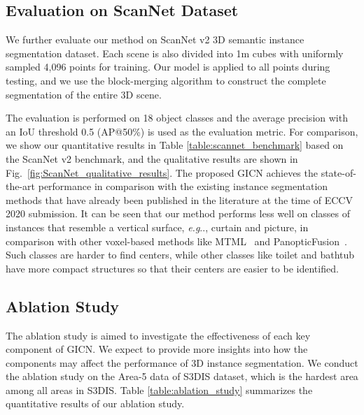 \documentclass[runningheads]{llncs}
\makeatletter
\DeclareRobustCommand\onedot{\futurelet\@let@token\@onedot}
\def\@onedot{\ifx\@let@token.\else.\null\fi\xspace}
\def\eg{\emph{e.g}\onedot} \def\Eg{\emph{E.g}\onedot}
\makeatother
\begin{document}
\subsection{Evaluation on ScanNet Dataset}
We further evaluate our method on ScanNet v2 3D semantic instance segmentation dataset. Each scene is also divided into 1m cubes with uniformly sampled 4{,}096 points for training. Our model is applied to all points during testing, and we use the block-merging algorithm \cite{WangYHN18} to construct the complete segmentation of the entire 3D scene.

The evaluation is performed on 18 object classes and the average precision with an IoU threshold 0.5 (AP@50\%) is used as the evaluation metric. For comparison, we show our quantitative results in Table \ref{table:scannet_benchmark} based on the ScanNet v2 benchmark, and the qualitative results are shown in Fig.~\ref{fig:ScanNet_qualitative_results}. The proposed GICN achieves the state-of-the-art performance in comparison with the existing instance segmentation methods that have already been published in the literature at the time of ECCV 2020 submission. It can be seen that our method performs less well on classes of instances that resemble a vertical surface, \eg, curtain and picture, in comparison with other voxel-based methods like MTML~\cite{LahoudGPO19} and PanopticFusion~\cite{NaritaSIK19}. Such classes are harder to find centers, while other classes like toilet and bathtub have more compact structures so that their centers are easier to be identified. 



\subsection{Ablation Study}
The ablation study is aimed to investigate the effectiveness of each key component of GICN. We expect to provide more insights into how the components may affect the performance of 3D instance segmentation. We conduct the ablation study on the Area-5 data of S3DIS dataset, which is the hardest area among all areas in S3DIS. Table \ref{table:ablation_study} summarizes the quantitative results of our ablation study.

\begin{comment}
Need to add new ablation study : prior information of class size (from CVPR revier #5)

Reviewer #4 does not like the ablation study of semantic prediction, could we remove it ?
\end{comment}
\end{document}
